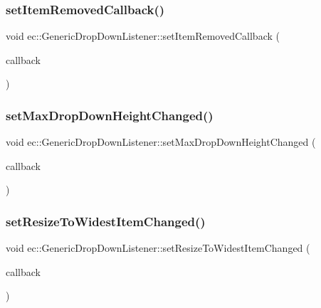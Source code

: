 \subsubsection{\texorpdfstring{set\+Item\+Removed\+Callback()}{setItemRemovedCallback()}}
{\footnotesize\ttfamily void ec\+::\+Generic\+Drop\+Down\+Listener\+::set\+Item\+Removed\+Callback (\begin{DoxyParamCaption}\item[{const \mbox{\hyperlink{classec_1_1_generic_drop_down_listener_ad1513561f8a3a3614e207797df83e730}{Item\+Removed\+\_\+\+Callback}} \&}]{callback }\end{DoxyParamCaption})}

\mbox{\label{classec_1_1_generic_drop_down_listener_ae6abf1bd443a68747844d7ca913cff96}} 
\subsubsection{\texorpdfstring{set\+Max\+Drop\+Down\+Height\+Changed()}{setMaxDropDownHeightChanged()}}
{\footnotesize\ttfamily void ec\+::\+Generic\+Drop\+Down\+Listener\+::set\+Max\+Drop\+Down\+Height\+Changed (\begin{DoxyParamCaption}\item[{const \mbox{\hyperlink{classec_1_1_generic_drop_down_listener_a4acbadec20937340572893a989e248f1}{Max\+Drop\+Down\+Height\+Changed\+\_\+\+Callback}} \&}]{callback }\end{DoxyParamCaption})}

\mbox{\label{classec_1_1_generic_drop_down_listener_a21fbfc8758a5829d06a0fc589a93c87c}} 
\subsubsection{\texorpdfstring{set\+Resize\+To\+Widest\+Item\+Changed()}{setResizeToWidestItemChanged()}}
{\footnotesize\ttfamily void ec\+::\+Generic\+Drop\+Down\+Listener\+::set\+Resize\+To\+Widest\+Item\+Changed (\begin{DoxyParamCaption}\item[{const \mbox{\hyperlink{classec_1_1_generic_drop_down_listener_a3a4f9e1a8d9e016ea30e8cc781b8bcb9}{Resize\+To\+Widest\+Item\+Changed\+\_\+\+Callback}} \&}]{callback }\end{DoxyParamCaption})}



